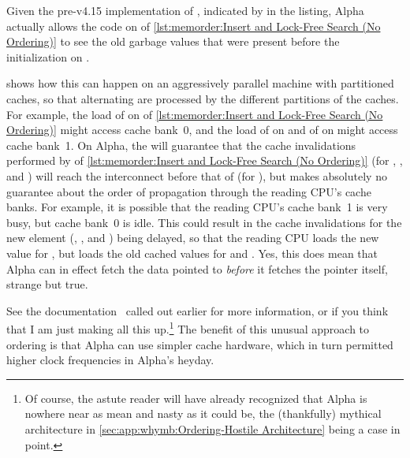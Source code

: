 \begin{fcvref}
Given the pre-v4.15 implementation of , indicated by
 in the listing, Alpha actually allows the code on
 of
\cref{lst:memorder:Insert and Lock-Free Search (No Ordering)}
to see the old garbage values that were present before the initialization
on .

shows how this can happen on
an aggressively parallel machine with partitioned caches, so that
alternating  are processed by the different partitions
of the caches.
For example, the load of  on  of
\cref{lst:memorder:Insert and Lock-Free Search (No Ordering)}
might access cache bank~0,
and the load of  on  and of  on 
might access cache bank~1.
On Alpha, the  will guarantee that the cache
invalidations performed by  of
\cref{lst:memorder:Insert and Lock-Free Search (No Ordering)}
(for , , and ) will reach
the interconnect before that of  (for ), but
makes absolutely no guarantee about the order of
propagation through the reading CPU's cache banks.
For example, it is possible that the reading CPU's cache bank~1 is very
busy, but cache bank~0 is idle.
This could result in the cache invalidations for the new element
(, , and ) being
delayed, so that the reading CPU loads the new value for ,
but loads the old cached values for  and .
Yes, this does mean that Alpha can in effect fetch
the data pointed to {\em before} it fetches the pointer itself, strange
but true.
\end{fcvref}
See the documentation~\cite{Compaq01,WilliamPugh2000Gharachorloo}
called out earlier for more information,
or if you think that I am just making all this up.\footnote{
	Of course, the astute reader will have already recognized that
	Alpha is nowhere near as mean and nasty as it could be,
	the (thankfully) mythical architecture in
	\cref{sec:app:whymb:Ordering-Hostile Architecture}
	being a case in point.}
The benefit of this unusual approach to ordering is that Alpha can use
simpler cache hardware, which in turn permitted higher clock frequencies
in Alpha's heyday.

